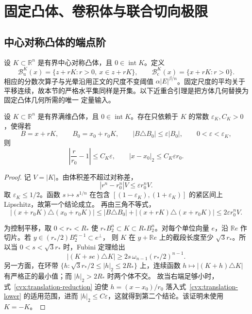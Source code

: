 \section{固定凸体、卷积体与联合切向极限}
\label{cvx:section}

\subsection{中心对称凸体的端点阶}

设 $K\subset\mathbb R^n$ 是有界中心对称凸体，且 $0\in\operatorname{int}K$。定义
\[
 \mathcal B^K_{\mathrm u}(x)=\{z+rK:r>0,\ x\in z+rK\},
 \qquad
 \mathcal B^K_{\mathrm c}(x)=\{x+rK:r>0\}.
\]
相应的分数次算子与光晕沿用正文的尺度不变阈值
$\alpha|E|^{\beta/n}$。固定尺度的平均关于平移连续，故本节的严格水平集同样是开集。以下近重合引理是把方体几何替换为固定凸体几何所需的唯一
定量输入。

\begin{lemma}[近重合位似凸体]
\label{cvx:near-homothetic}
设 $K\subset\mathbb R^n$ 是有界满维凸体，且 $0\in\operatorname{int}K$。存在只依赖于
$K$ 的常数 $\varepsilon_K,C_K>0$，使得若
\[
 B=x+rK,\qquad B_0=x_0+r_0K,\qquad
 |B\triangle B_0|\le\varepsilon|B_0|,\qquad 0<\varepsilon<\varepsilon_K,
\]
则
\begin{equation}
 \left|\frac r{r_0}-1\right|\le C_K\varepsilon,
 \qquad
 |x-x_0|_2\le C_K\varepsilon r_0.
 \label{cvx:near-homothetic-bound}
\end{equation}
\end{lemma}

\begin{proof}
记 $V=|K|$。由体积差不超过对称差，
\[
 |r^n-r_0^n|V\le\varepsilon r_0^nV.
\]
取 $\varepsilon_K\le1/2$。函数 $s\mapsto s^{1/n}$ 在包含
$[(1-\varepsilon_K),(1+\varepsilon_K)]$ 的紧区间上 Lipschitz，故第一个结论成立。
再由三角不等式，
\begin{equation}
 |(x+r_0K)\triangle(x_0+r_0K)|
 \le |B\triangle B_0|+|(x+rK)\triangle(x+r_0K)|
 \le2\varepsilon r_0^nV.
 \label{cvx:translation-reduction}
\end{equation}

为控制平移，取 $0<r_*<R_*$ 使
$r_*B_2^n\subset K\subset R_*B_2^n$。对每个单位向量 $e$，沿
$\mathbb Re$ 作切片。若 $y\in(r_*/2)B_2^{n-1}\subset e^\perp$，
则 $K$ 在 $y+\mathbb Re$ 上的截段长度至少 $\sqrt3r_*$。所以当
$0<s<\sqrt3r_*$ 时，Fubini 定理给出
\begin{equation}
 |(K+se)\triangle K|\ge2s\,\omega_{n-1}(r_*/2)^{n-1}.
 \label{cvx:translation-lower}
\end{equation}
另一方面，在环带 $\{h:\sqrt3r_*/2\le|h|_2\le2R_*\}$ 上，连续函数
$h\mapsto|(K+h)\triangle K|$ 有严格正的最小值；而 $|h|_2>2R_*$ 时两个体不交。
故当右端足够小时，式~\eqref{cvx:translation-reduction} 迫使
$h=(x-x_0)/r_0$ 落入式~\eqref{cvx:translation-lower} 的适用范围，进而
$|h|_2\le C\varepsilon$，这就得到第二个结论。该证明未使用 $K=-K$。
\end{proof}

